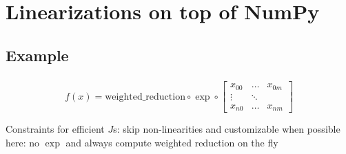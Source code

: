 \documentclass[aspectratio=169,xcolor=dvipsnames]{beamer}
\begin{document}
\section{Linearizations on top of NumPy}  %

\subsection{Example}
\begin{frame}
	\frametitle{\insertsection}
	\framesubtitle{\insertsubsection}

	\begin{equation*}  %
		f(x) =
		\text{weighted\_reduction}
		\circ
		\exp
		\circ
		\begin{bmatrix}
			x_{00} & \dots & x_{0m} \\
			\vdots & \ddots & \\
			x_{n0} & \dots & x_{nm}
		\end{bmatrix}
	\end{equation*}

	\vspace{1em}
	\begin{center}
		Constraints for efficient $J$s: skip non-linearities and customizable when possible
		\\here: no $\exp$ and always compute weighted reduction on the fly
	\end{center}

\end{frame}
\end{document}
